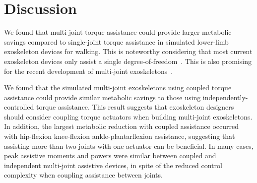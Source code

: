 \documentclass[10pt,letterpaper]{article}
\begin{document}
\section*{Discussion}
We found that multi-joint torque assistance could provide larger metabolic savings compared to single-joint torque assistance in simulated lower-limb exoskeleton devices for walking. This is noteworthy considering that most current exoskeleton devices only assist a single degree-of-freedom~\cite{Gordon:2007, Mooney:2014, Collins:2015, Zhang:2017, Galle:2017, Kim:2019, Lim:2019}. This is also promising for the recent development of multi-joint exoskeletons~\cite{Quinlivan:2017, Malcolm:2018, Bryan:2020}.
 
We found that the simulated multi-joint exoskeletons using coupled torque assistance could provide similar metabolic savings to those using independently-controlled torque assistance. This result suggests that exoskeleton designers should consider coupling torque actuators when building multi-joint exoskeletons. In addition, the largest metabolic reduction with coupled assistance occurred with hip-flexion knee-flexion ankle-plantarflexion assistance, suggesting that assisting more than two joints with one actuator can be beneficial. In many cases, peak assistive moments and powers were similar between coupled and independent multi-joint assistive devices, in spite of the reduced control complexity when coupling assistance between joints.
 
\end{document}
